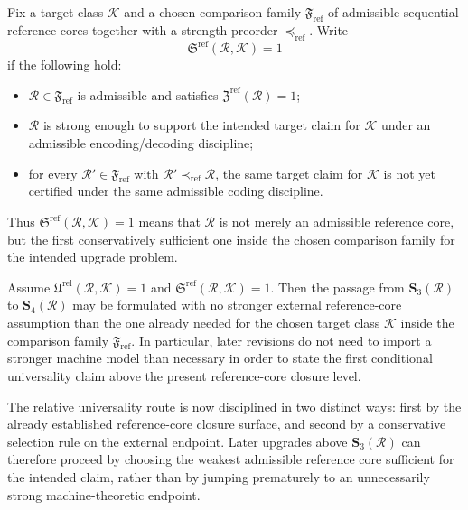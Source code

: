 \begin{definition}
Fix a target class \(\mathcal K\) and a chosen comparison family \(\mathfrak F_{\mathrm{ref}}\) of admissible sequential reference cores together with a strength preorder \(\preceq_{\mathrm{ref}}\). Write
\[
\mathfrak S^{\mathrm{ref}}(\mathcal R,\mathcal K)=1
\]
if the following hold:
\begin{itemize}[leftmargin=2em]
  \item \(\mathcal R\in\mathfrak F_{\mathrm{ref}}\) is admissible and satisfies \(\mathfrak Z^{\mathrm{ref}}(\mathcal R)=1\);
  \item \(\mathcal R\) is strong enough to support the intended target claim for \(\mathcal K\) under an admissible encoding/decoding discipline;
  \item for every \(\mathcal R'\in\mathfrak F_{\mathrm{ref}}\) with \(\mathcal R'\prec_{\mathrm{ref}}\mathcal R\), the same target claim for \(\mathcal K\) is not yet certified under the same admissible coding discipline.
\end{itemize}
Thus \(\mathfrak S^{\mathrm{ref}}(\mathcal R,\mathcal K)=1\) means that \(\mathcal R\) is not merely an admissible reference core, but the first conservatively sufficient one inside the chosen comparison family for the intended upgrade problem.
\end{definition}

\begin{proposition}
Assume \(\mathfrak U^{\mathrm{rel}}(\mathcal R,\mathcal K)=1\) and \(\mathfrak S^{\mathrm{ref}}(\mathcal R,\mathcal K)=1\). Then the passage from \(\mathbf S_3(\mathcal R)\) to \(\mathbf S_4(\mathcal R)\) may be formulated with no stronger external reference-core assumption than the one already needed for the chosen target class \(\mathcal K\) inside the comparison family \(\mathfrak F_{\mathrm{ref}}\). In particular, later revisions do not need to import a stronger machine model than necessary in order to state the first conditional universality claim above the present reference-core closure level.
\end{proposition}

\begin{corollary}
The relative universality route is now disciplined in two distinct ways: first by the already established reference-core closure surface, and second by a conservative selection rule on the external endpoint. Later upgrades above \(\mathbf S_3(\mathcal R)\) can therefore proceed by choosing the weakest admissible reference core sufficient for the intended claim, rather than by jumping prematurely to an unnecessarily strong machine-theoretic endpoint.
\end{corollary}


